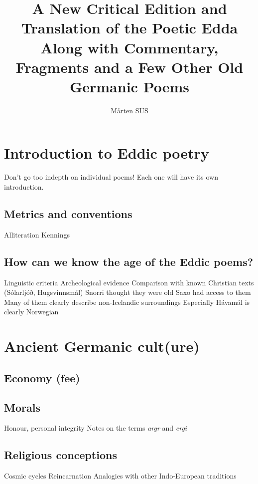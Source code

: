 
\title{%
  A New Critical Edition and Translation of the Poetic Edda \\
  \large Along with Commentary, Fragments and a Few Other Old Germanic Poems}

\author{Mårten SUS}

\maketitle

\tableofcontents

\chapter{Introduction to Eddic poetry}
  Don't go too indepth on individual poems! Each one will have its own introduction.
  \section{Metrics and conventions}
    Alliteration
    Kennings
  \section{How can we know the age of the Eddic poems?}
    Linguistic criteria
    Archeological evidence
    Comparison with known Christian texts (Sólarljóð, Hugsvinnsmál)
    Snorri thought they were old
    Saxo had access to them
    Many of them clearly describe non-Icelandic surroundings
      Especially Hávamál is clearly Norwegian

\chapter{Ancient Germanic cult(ure)}
  \section{Economy (fee)}
  \section{Morals}
    Honour, personal integrity
    Notes on the terms \emph{argr} and \emph{ergi}
  \section{Religious conceptions}
    Cosmic cycles
    Reincarnation
    Analogies with other Indo-European traditions

